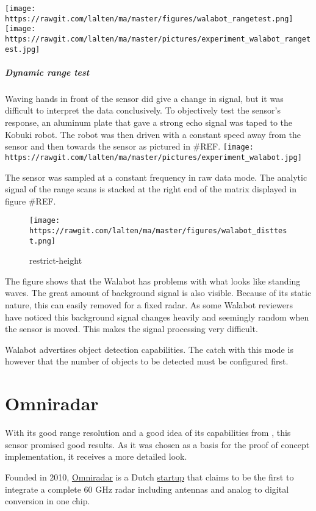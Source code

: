 \texttt{[image: https://rawgit.com/lalten/ma/master/figures/walabot\_rangetest.png]}
\texttt{[image: https://rawgit.com/lalten/ma/master/pictures/experiment\_walabot\_rangetest.jpg]}

\subparagraph{Dynamic range test}\label{dynamic-range-test}

Waving hands in front of the sensor did give a change in signal, but it
was difficult to interpret the data conclusively. To objectively test
the sensor's response, an aluminum plate that gave a strong echo signal
was taped to the Kobuki robot. The robot was then driven with a constant
speed away from the sensor and then towards the sensor as pictured in
\#REF.
\texttt{[image: https://rawgit.com/lalten/ma/master/pictures/experiment\_walabot.jpg]}

The sensor was sampled at a constant frequency in raw data mode. The
analytic signal of the range scans is stacked at the right end of the
matrix displayed in figure \#REF.

\begin{figure}
\centering
\texttt{[image: https://rawgit.com/lalten/ma/master/figures/walabot\_disttest.png]}
\caption{restrict-height}
\end{figure}

The figure shows that the Walabot has problems with what looks like
standing waves. The great amount of background signal is also visible.
Because of its static nature, this can easily removed for a fixed radar.
As some Walabot reviewers have noticed \cite{Valens2016} this background
signal changes heavily and seemingly random when the sensor is moved.
This makes the signal processing very difficult.

Walabot advertises object detection capabilities. The catch with this
mode is however that the number of objects to be detected must be
configured first.

\section{Omniradar}\label{omniradar}

With its good range resolution and a good idea of its capabilities from
\cite{Ernst2016}, this sensor promised good results. As it was chosen as
a basis for the proof of concept implementation, it receives a more
detailed look.

Founded in 2010, \href{https://www.omniradar.com/}{Omniradar} is a Dutch
\href{https://www.crunchbase.com/organization/omniradar}{startup} that
claims to be the first to integrate a complete 60 GHz radar including
antennas and analog to digital conversion in one chip.

